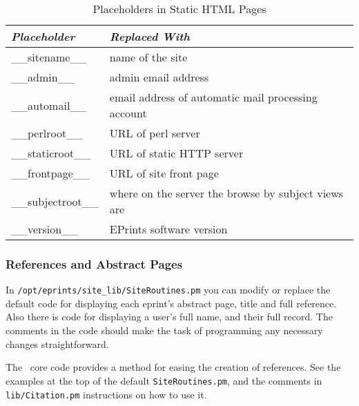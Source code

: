 \begin{table}
\begin{center}
\begin{tabular}{|l|l|}
\hline
\emph{Placeholder}  & \emph{Replaced With}                                \\
\hline 
\_\_sitename\_\_    & name of the site                                    \\
\_\_admin\_\_       & admin email address                                 \\
\_\_automail\_\_    & email address of automatic mail processing account  \\
\_\_perlroot\_\_    & URL of perl server                                  \\
\_\_staticroot\_\_  & URL of static HTTP server                           \\
\_\_frontpage\_\_   & URL of site front page                              \\
\_\_subjectroot\_\_ & where on the server the browse by subject views are \\
\_\_version\_\_     & EPrints software version                            \\
\hline
\end{tabular}
\caption{\label{install_placeholders} Placeholders in Static HTML Pages}
\end{center}
\end{table}


\subsubsection{References and Abstract Pages}

In {\tt /opt/eprints/site\_lib/SiteRoutines.pm} you can modify or replace the default code for displaying each eprint's abstract page, title and full reference. Also there is code for displaying a user's full name, and their full record. The comments in the code should make the task of programming any necessary changes straightforward.

The \eprints\ core code provides a method for easing the creation of references. See the examples at the top of the default {\tt SiteRoutines.pm}, and the comments in {\tt lib/Citation.pm} instructions on how to use it.

